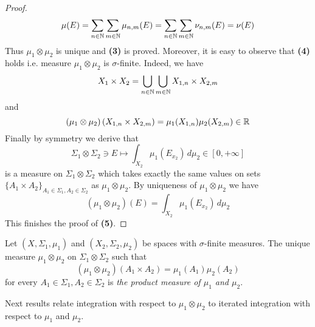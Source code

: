 \begin{proof}
$$\mu(E) = \sum_{n\in {\mathbb N}}\sum_{m\in {\mathbb N}}\mu_{n,m}(E) = \sum_{n\in {\mathbb N}}\sum_{m\in {\mathbb N}}\nu_{n,m}(E) = \nu(E)$$
Thus $\mu_1\otimes \mu_2$ is unique and \textbf{(3)} is proved. Moreover, it is easy to observe that \textbf{(4)} holds i.e. measure $\mu_1\otimes \mu_2$ is $\sigma$-finite. Indeed, we have
$$X_1\times X_2 = \bigcup_{n\in {\mathbb N}}\bigcup_{m\in {\mathbb N}}X_{1,n}\times X_{2,m}$$
and
$$\left(\mu_1\otimes \mu_2\right)\left(X_{1,n}\times X_{2,m}\right) = \mu_1(X_{1,n})\mu_2(X_{2,m}) \in {\mathbb R}$$
Finally by symmetry we derive that
$$\Sigma_1\otimes \Sigma_2\ni E \mapsto \int_{X_2}\mu_1(E_{x_2})\,d\mu_2\in [0,+\infty]$$
is a measure on $\Sigma_1\otimes \Sigma_2$ which takes exactly the same values on sets $\big\{A_1\times A_2\big\}_{A_1\in \Sigma_1,A_2\in \Sigma_2}$ as $\mu_1\otimes \mu_2$. By uniqueness of $\mu_1\otimes \mu_2$ we have
$$(\mu_1\otimes \mu_2)(E) = \int_{X_2}\mu_1(E_{x_2})\,d\mu_2$$
This finishes the proof of \textbf{(5)}.
\end{proof}

\begin{definition}
Let $(X,\Sigma_1,\mu_1)$ and $(X_2,\Sigma_2,\mu_2)$ be spaces with $\sigma$-finite measures. The unique measure $\mu_1\otimes \mu_2$ on $\Sigma_1\otimes \Sigma_2$ such that
$$\left(\mu_1\otimes \mu_2\right)\left(A_1\times A_2\right) = \mu_1(A_1)\mu_2(A_2)$$
for every $A_1\in \Sigma_1, A_2\in \Sigma_2$ is \textit{the product measure of $\mu_1$ and $\mu_2$}.
\end{definition}
\noindent
Next results relate integration with respect to $\mu_1\otimes \mu_2$ to iterated integration with respect to $\mu_1$ and $\mu_2$.

